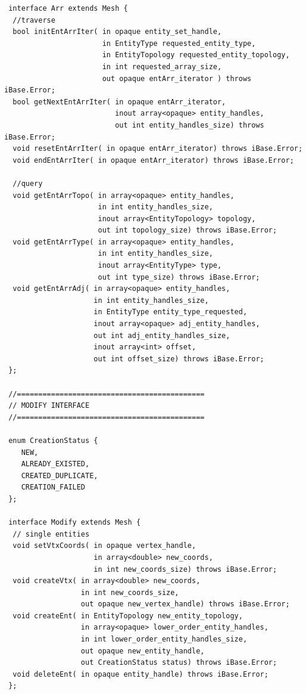 \documentclass{article}
\begin{document}
\begin{small}
\begin{verbatim}
 interface Arr extends Mesh { 
  //traverse 
  bool initEntArrIter( in opaque entity_set_handle, 
                       in EntityType requested_entity_type,  
                       in EntityTopology requested_entity_topology, 
                       in int requested_array_size, 
                       out opaque entArr_iterator ) throws iBase.Error;
  bool getNextEntArrIter( in opaque entArr_iterator, 
                          inout array<opaque> entity_handles, 
                          out int entity_handles_size) throws iBase.Error; 
  void resetEntArrIter( in opaque entArr_iterator) throws iBase.Error; 
  void endEntArrIter( in opaque entArr_iterator) throws iBase.Error;

  //query  
  void getEntArrTopo( in array<opaque> entity_handles, 
                      in int entity_handles_size, 
                      inout array<EntityTopology> topology, 
                      out int topology_size) throws iBase.Error; 
  void getEntArrType( in array<opaque> entity_handles, 
                      in int entity_handles_size, 
                      inout array<EntityType> type, 
                      out int type_size) throws iBase.Error; 
  void getEntArrAdj( in array<opaque> entity_handles, 
                     in int entity_handles_size, 
                     in EntityType entity_type_requested,  
                     inout array<opaque> adj_entity_handles,  
                     out int adj_entity_handles_size, 
                     inout array<int> offset,  
                     out int offset_size) throws iBase.Error; 
 };

 //============================================ 
 // MODIFY INTERFACE 
 //============================================

 enum CreationStatus {  
    NEW,  
    ALREADY_EXISTED,   
    CREATED_DUPLICATE, 
    CREATION_FAILED 
 };

 interface Modify extends Mesh {
  // single entities 
  void setVtxCoords( in opaque vertex_handle,  
                     in array<double> new_coords, 
                     in int new_coords_size) throws iBase.Error; 
  void createVtx( in array<double> new_coords, 
                  in int new_coords_size, 
                  out opaque new_vertex_handle) throws iBase.Error; 
  void createEnt( in EntityTopology new_entity_topology, 
                  in array<opaque> lower_order_entity_handles,  
                  in int lower_order_entity_handles_size, 
                  out opaque new_entity_handle, 
                  out CreationStatus status) throws iBase.Error;  
  void deleteEnt( in opaque entity_handle) throws iBase.Error; 
 };


\end{verbatim}
\end{small}
\end{document}
